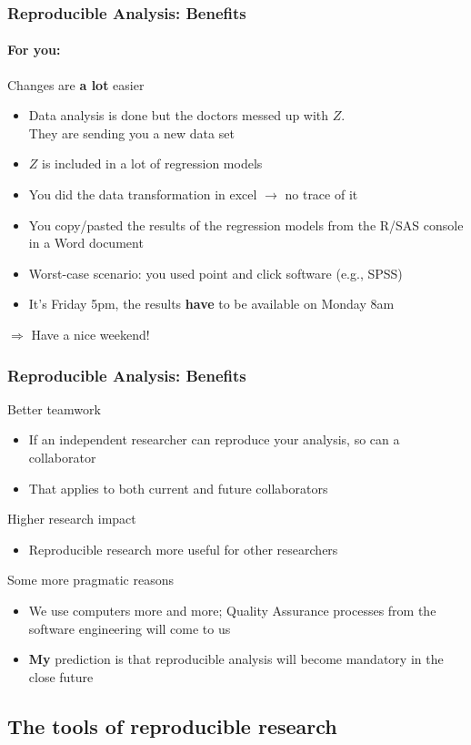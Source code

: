 \documentclass[paper=screen,mathserif]{beamer}\usepackage[]{graphicx}\usepackage[]{color}
\begin{document}
\begin{frame}
  \frametitle{Reproducible Analysis: Benefits}
  \framesubtitle{For you:}
  Changes are {\bf a lot} easier
  \begin{itemize}
  \item Data analysis is done but the doctors messed up with $Z$.\\
    They are sending you a new data set
  \item $Z$ is included in a lot of regression models
  \item You did the data transformation in excel $\rightarrow$ no
    trace of it
  \item You copy/pasted the results of the regression models from the
    R/SAS console in a Word document
  \item Worst-case scenario: you used point and click software (e.g., SPSS)
  \item It's Friday 5pm, the results {\bf have} to be available on Monday 8am
  \end{itemize}
  $\Rightarrow$ Have a nice weekend!
\end{frame}

\begin{frame}
  \frametitle{Reproducible Analysis: Benefits}
  Better teamwork
  \begin{itemize}
  \item If an independent researcher can reproduce your analysis, so
    can a collaborator
  \item That applies to both current and future collaborators
  \end{itemize}
  Higher research impact
  \begin{itemize}
  \item Reproducible research more useful for other researchers
  \end{itemize}\pause
  Some more pragmatic reasons
  \begin{itemize}
  \item We use computers more and more; Quality Assurance processes
    from the software engineering will come to us
  \item {\bf My} prediction is that reproducible analysis will become
    mandatory in the close future
  \end{itemize}
\end{frame}

\subsection{The tools of reproducible research}
\end{document}
